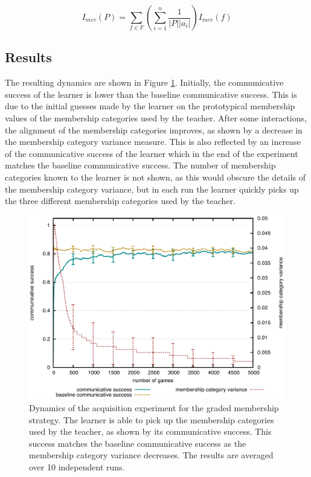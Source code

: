 \begin{equation}
  I_{mcv}(P) = \sum_{f \in F} \left(\sum_{i=1}^{n} \frac{1}{|P||a_i|}\right) I_{mcv}(f)
\label{eq:mcv-population}
\end{equation}

\subsection{Results}

The resulting dynamics are shown in Figure
\ref{f:gm-acquisition-dynamics}. Initially, the communicative success
of the learner is lower than the baseline communicative success. This is due to the
initial guesses made by the learner on the prototypical membership values of the 
membership categories used by the teacher. After some interactions, the
alignment of the membership categories improves, as shown by a
decrease in the membership category variance measure. This is
also reflected by an increase of the communicative success of the learner
which in the end of the experiment matches the baseline communicative
success. The number of membership categories known to the learner is
not shown, as this would obscure the details of the membership
category variance, but in each run the learner quickly picks up the three different
membership categories used by the teacher.

\begin{figure}[htpb]
  \begin{center}
    \includegraphics[width=.8\textwidth]{./graded-membership/figures/strict-acquisition.pdf}
    \caption[Dynamics of the acquisition experiment for the graded
    membership strategy]{Dynamics of the acquisition experiment for
      the graded membership strategy. The learner is able to pick up
      the membership categories used by the teacher, as shown by its
      communicative success. This success matches the baseline communicative
      success as the membership category variance decreases. The
      results are averaged over 10 independent runs.}
    \label{f:gm-acquisition-dynamics}
  \end{center}
\end{figure}


